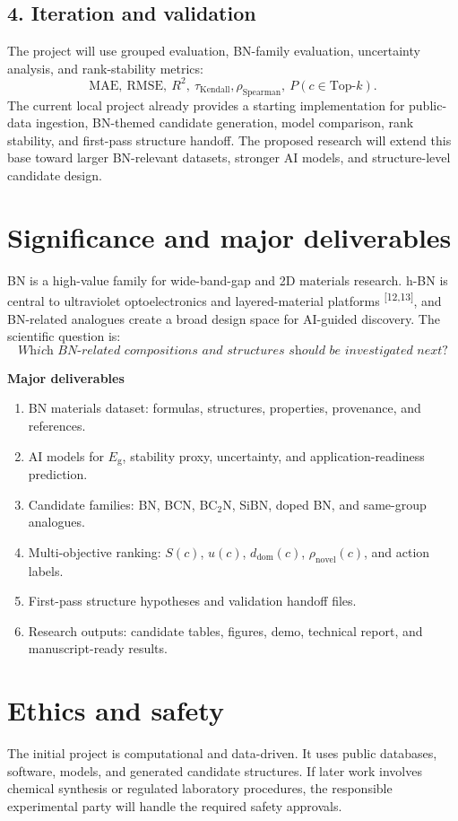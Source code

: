 \documentclass[10pt]{article}
\newcommand{\eg}{E_{\mathrm{g}}}
\newcommand{\unc}{u}
\newcommand{\domain}{d_{\mathrm{dom}}}
\begin{document}
\subsection*{4. Iteration and validation}
The project will use grouped evaluation, BN-family evaluation, uncertainty analysis, and rank-stability metrics:
\[
  \mathrm{MAE},\ \mathrm{RMSE},\ R^2,\ \tau_{\mathrm{Kendall}},
  \rho_{\mathrm{Spearman}},\ P(c\in\mathrm{Top}\text{-}k).
\]
The current local project already provides a starting implementation for public-data ingestion, BN-themed candidate generation, model comparison, rank stability, and first-pass structure handoff. The proposed research will extend this base toward larger BN-relevant datasets, stronger AI models, and structure-level candidate design.

\section*{Significance and major deliverables}
BN is a high-value family for wide-band-gap and 2D materials research. h-BN is central to ultraviolet optoelectronics and layered-material platforms \textsuperscript{[12,13]}, and BN-related analogues create a broad design space for AI-guided discovery. The scientific question is:
\[
  \textit{Which BN-related compositions and structures should be investigated next?}
\]

\textbf{Major deliverables}
\begin{enumerate}
  \item BN materials dataset: formulas, structures, properties, provenance, and references.
  \item AI models for $\eg$, stability proxy, uncertainty, and application-readiness prediction.
  \item Candidate families: BN, BCN, BC$_2$N, SiBN, doped BN, and same-group analogues.
  \item Multi-objective ranking: $S(c)$, $\unc(c)$, $\domain(c)$, $\rho_{\mathrm{novel}}(c)$, and action labels.
  \item First-pass structure hypotheses and validation handoff files.
  \item Research outputs: candidate tables, figures, demo, technical report, and manuscript-ready results.
\end{enumerate}

\section*{Ethics and safety}
The initial project is computational and data-driven. It uses public databases, software, models, and generated candidate structures. If later work involves chemical synthesis or regulated laboratory procedures, the responsible experimental party will handle the required safety approvals.
\end{document}
